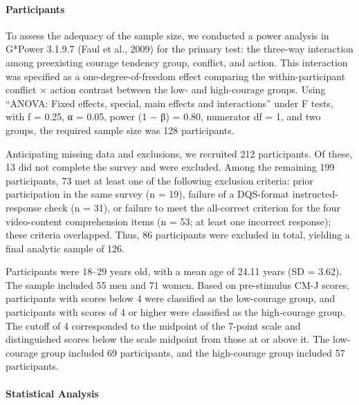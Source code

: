 \documentclass[
]{article}
\begin{document}
\paragraph{Participants}\label{participants-1}

To assess the adequacy of the sample size, we conducted a power analysis
in G*Power 3.1.9.7 (Faul et al., 2009) for the primary test: the
three-way interaction among preexisting courage tendency group,
conflict, and action. This interaction was specified as a
one-degree-of-freedom effect comparing the within-participant conflict ×
action contrast between the low- and high-courage groups. Using ``ANOVA:
Fixed effects, special, main effects and interactions'' under F tests,
with f = 0.25, α = 0.05, power (1 − β) = 0.80, numerator df = 1, and two
groups, the required sample size was 128 participants.

Anticipating missing data and exclusions, we recruited 212 participants.
Of these, 13 did not complete the survey and were excluded. Among the
remaining 199 participants, 73 met at least one of the following
exclusion criteria: prior participation in the same survey (n = 19),
failure of a DQS-format instructed-response check (n = 31), or failure
to meet the all-correct criterion for the four video-content
comprehension items (n = 53; at least one incorrect response); these
criteria overlapped. Thus, 86 participants were excluded in total,
yielding a final analytic sample of 126.

Participants were 18--29 years old, with a mean age of 24.11 years (SD =
3.62). The sample included 55 men and 71 women. Based on pre-stimulus
CM-J scores, participants with scores below 4 were classified as the
low-courage group, and participants with scores of 4 or higher were
classified as the high-courage group. The cutoff of 4 corresponded to
the midpoint of the 7-point scale and distinguished scores below the
scale midpoint from those at or above it. The low-courage group included
69 participants, and the high-courage group included 57 participants.

\paragraph{Statistical Analysis}\label{statistical-analysis-1}
\end{document}
